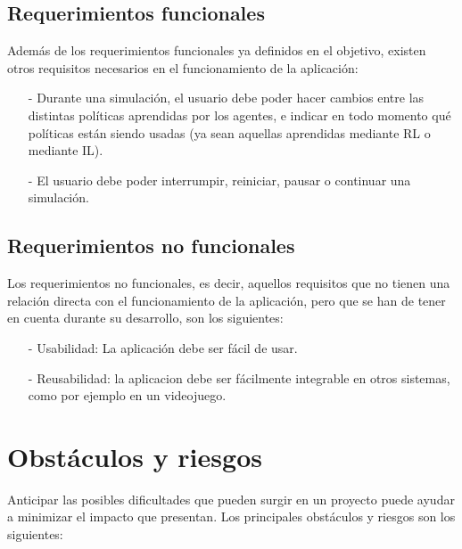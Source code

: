 \subsection{Requerimientos funcionales}

Además de los requerimientos funcionales ya definidos en el objetivo, existen otros requisitos necesarios en el funcionamiento de la aplicación:

\begin{enumerate}
    \item[-] Durante una simulación, el usuario debe poder hacer cambios entre las distintas políticas aprendidas por los agentes, e indicar en todo momento qué políticas están siendo usadas (ya sean aquellas aprendidas mediante RL o mediante IL).
    \item[-] El usuario debe poder interrumpir, reiniciar, pausar o continuar una simulación.
\end{enumerate}

\newpage

\subsection{Requerimientos no funcionales}

Los requerimientos no funcionales, es decir, aquellos requisitos que no tienen una relación directa con el funcionamiento de la aplicación, pero que se han de tener en cuenta durante su desarrollo, son los siguientes:

\begin{enumerate}
    \item[-] Usabilidad: La aplicación debe ser fácil de usar.
    \item[-] Reusabilidad: la aplicacion debe ser fácilmente integrable en otros sistemas, como por ejemplo en un videojuego.
\end{enumerate}

\section{Obstáculos y riesgos}

Anticipar las posibles dificultades que pueden surgir en un proyecto puede ayudar a minimizar el impacto que presentan. Los principales obstáculos y riesgos son los siguientes:


